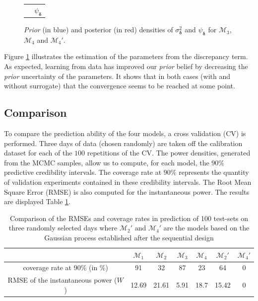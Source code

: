 \documentclass[soumission]{jsfds}
\begin{document}
\begin{figure}[htbp!]
\begin{center}
\begin{tabular}{cccc}
	&\multicolumn{3}{c}{$\psi_{\boldsymbol{\delta}}$}\\
  \end{tabular}   
\caption{\textit{Prior} (in blue) and posterior (in red) densities of $\sigma_{\boldsymbol{\delta}}^2$ and $\psi_{\boldsymbol{\delta}}$ for $\mathcal{M}_3$, $\mathcal{M}_4$ and $\mathcal{M}_4'$.}
\label{fig:comparisionDensities2}
\end{center}
\end{figure}

Figure \ref{fig:comparisionDensities2} illustrates the estimation of the parameters from the discrepancy term.
As expected, learning from data has improved our \textit{prior} belief by decreasing the \textit{prior} uncertainty of the parameters. 
It shows that in both cases (with and without surrogate) that the convergence seems to be reached at some point. \newline

\subsection{Comparison}

To compare the prediction ability of the four models,
a cross validation (CV) is performed.
Three days of data (chosen randomly) are taken off the calibration dataset for each of the $100$ repetitions of the CV. 
The power densities, generated from the MCMC samples, allow us to compute, for each model, the $90\%$ predictive credibility intervals. 
The coverage rate at $90\%$ represents the quantity of validation experiments contained in these credibility intervals.
The Root Mean Square Error (RMSE) is also computed for the instantaneous power. The results are displayed Table 
\ref{tab:comparison}.\newline

\begin{table}[htbp!]
\centering
\caption{Comparison of the RMSEs and coverage rates in prediction of 100 test-sets on three randomly selected days where $\mathcal{M}_2'$ and $\mathcal{M}_4'$ are the models based on the Gaussian process established after the sequential design}
\label{tab:comparison}
\begin{tabular}{c|c|c|c|c|c|c}

& $\mathcal{M}_1$ & $\mathcal{M}_2$ & $\mathcal{M}_3$ & $\mathcal{M}_4$ & $\mathcal{M}_2'$&  $\mathcal{M}_4'$ \\
\hline
\hline
coverage rate at 90\% (in \%) & 91 & 32 & 87 & 23 & 64 & 0 \\
\hline
RMSE of the instantaneous power ($W$) & 12.69 & 21.61 & 5.91 & 18.7 & 15.42 & 0 \\
\end{tabular}
\end{table}
\end{document}
